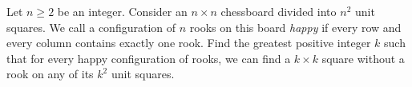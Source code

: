 Let $n \geq 2$ be an integer. Consider an $n \times n$ chessboard divided into $n^2$ unit squares. We call a configuration of $n$ rooks on this board \emph{happy} if every row and every column contains exactly one rook. Find the greatest positive integer $k$ such that for every happy configuration of rooks, we can find a $k \times k$ square without a rook on any of its $k^2$ unit squares.
